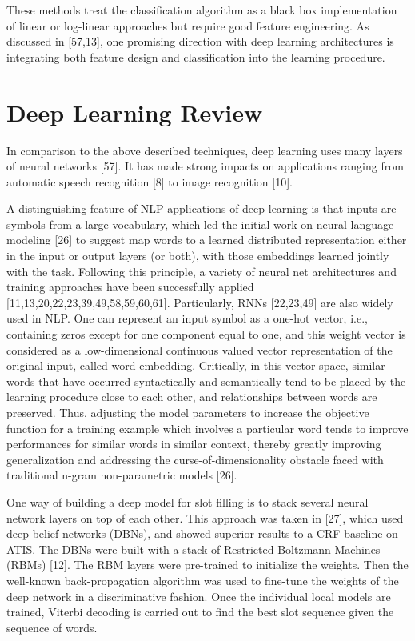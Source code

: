 These methods treat the classification algorithm as a black box implementation
of linear or log-linear approaches but require good feature engineering. As
discussed in [57,13], one promising direction with deep learning architectures
is integrating both feature design and classification into the learning
procedure.

\section{Deep Learning Review}
\label{sec:deepreview}

In comparison to the above described techniques, deep learning uses many layers
of neural networks [57]. It has made strong impacts on applications ranging
from automatic speech recognition [8] to image recognition [10]. 

A distinguishing feature of NLP applications of deep learning is that inputs
are symbols from a large vocabulary, which led the initial work on neural
language modeling [26] to suggest map words to a learned distributed
representation either in the input or output layers (or both), with those
embeddings learned jointly with the task. Following this principle, a variety
of neural net architectures and training approaches have been successfully
applied [11,13,20,22,23,39,49,58,59,60,61]. Particularly, RNNs [22,23,49] are
also widely used in NLP. One can represent an input symbol as a one-hot vector,
i.e., containing zeros except for one component equal to one, and this weight
vector is considered as a low-dimensional continuous valued vector
representation of the original input, called word embedding. Critically, in
this vector space, similar words that have occurred syntactically and
semantically tend to be placed by the learning procedure close to each other,
and relationships between words are preserved. Thus, adjusting the model
parameters to increase the objective function for a training example which
involves a particular word tends to improve performances for similar words in
similar context, thereby greatly improving generalization and addressing the
curse-of-dimensionality obstacle faced with traditional n-gram non-parametric
models [26].

One way of building a deep model for slot filling is to stack several neural
network layers on top of each other. This approach was taken in [27], which
used deep belief networks (DBNs), and showed superior results to a CRF baseline
on ATIS. The DBNs were built with a stack of Restricted Boltzmann Machines
(RBMs) [12]. The RBM layers were pre-trained to initialize the weights. Then
the well-known back-propagation algorithm was used to fine-tune the weights of
the deep network in a discriminative fashion. Once the individual local models
are trained, Viterbi decoding is carried out to find the best slot sequence
given the sequence of words. 

